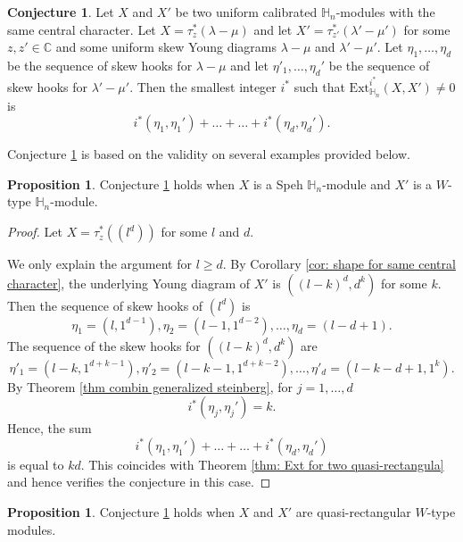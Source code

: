 \documentclass[11pt]{amsart}
\numberwithin{equation}{section}
\theoremstyle{definition}
\newtheorem{proposition}[thm]{Proposition}
\newtheorem{conjecture}[thm]{Conjecture}
\begin{document}
\begin{conjecture} \label{conj smallest ladder non vanishing}
Let $X$ and $X'$ be two uniform calibrated $\mathbb H_n$-modules with the same central character. Let $X=\tau^*_z(\lambda-\mu)$ and let $X'=\tau^*_{z'}(\lambda'-\mu')$ for some $z, z' \in \mathbb C$ and some uniform skew Young diagrams $\lambda-\mu$ and $\lambda'-\mu'$. Let $\eta_1,\ldots, \eta_d$ be the sequence of skew hooks for $\lambda-\mu$ and let $\eta'_1, \ldots, \eta_d'$ be the sequence of skew hooks for $\lambda'-\mu'$. Then the smallest integer $i^*$ such that $\mathrm{Ext}^{i^*}_{\mathbb H_n}(X, X')\neq 0$ is 
\[  i^*(\eta_1, \eta_1')+\ldots + \ldots + i^*(\eta_d, \eta_d') .
\]
\end{conjecture}

Conjecture \ref{conj smallest ladder non vanishing} is based on the validity on several examples provided below.






\begin{proposition} \label{prp conj speh w type}
Conjecture \ref{conj smallest ladder non vanishing} holds when $X$ is a Speh $\mathbb H_n$-module and $X'$ is a $W$-type $\mathbb H_n$-module.
\end{proposition}

\begin{proof}
Let $X=\tau^*_z((l^d))$ for some $l$ and $d$.

We only explain the argument for $l\geq d$. By Corollary \ref{cor: shape for same central character}, the underlying Young diagram of \(X'\) is \(((l-k)^{d}, d^k)\) for some $k$. Then the sequence of skew hooks of $(l^d)$ is
\[  \eta_1=(l, 1^{d-1}), \eta_2=(l-1, 1^{d-2}), \ldots, \eta_d=(l-d+1)  .
\]
 The sequence of the skew hooks for \( ((l-k)^d, d^k) \) are 
\[  \eta'_1=(l-k, 1^{d+k-1}), \eta'_2=(l-k-1, 1^{d+k-2}), \ldots, \eta'_d=(l-k-d+1, 1^{k}) .
\]
By Theorem \ref{thm combin generalized steinberg}, for $j=1,\ldots, d$
\[  i^*(\eta_j, \eta_j')=k .
\]
Hence, the sum
\[  i^*(\eta_1, \eta_1')+\ldots + \ldots + i^*(\eta_d, \eta_d')  
\]
is equal to $kd$. This coincides with Theorem \ref{thm: Ext for two quasi-rectangula} and hence verifies the conjecture in this case.
\end{proof}

\begin{proposition} \label{prop conj smallest ladder 1}
    Conjecture \ref{conj smallest ladder non vanishing} holds when $X$ and $X'$ are quasi-rectangular $W$-type modules.
\end{proposition}
\end{document}
